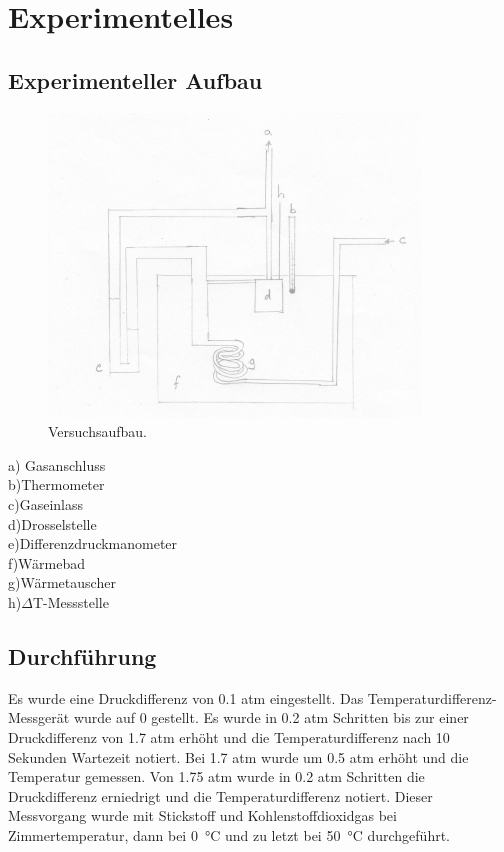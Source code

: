 \documentclass[a4paper,12pt,oneside,onecolum,final,openany]{report}
\begin{document}
\chapter{Experimentelles}
\section{Experimenteller Aufbau}
\begin{figure} [h!]
\begin{center}
\includegraphics[scale=1.5]{VersuchsaufbauJT.png} \end{center}
\caption{Versuchsaufbau.}
\end{figure}
a) Gasanschluss\\
b)Thermometer\\
c)Gaseinlass\\
d)Drosselstelle\\
e)Differenzdruckmanometer\\
f)Wärmebad\\
g)Wärmetauscher\\
h)$\Delta$T-Messstelle\\
\section{Durchführung}
Es wurde eine Druckdifferenz von 0.1 atm eingestellt. Das Temperaturdifferenz-Messgerät wurde auf 0 gestellt. Es wurde in 0.2 atm Schritten bis zur einer Druckdifferenz von 1.7 atm erhöht und die Temperaturdifferenz nach 10 Sekunden Wartezeit notiert. Bei 1.7 atm wurde um 0.5 atm erhöht und die Temperatur gemessen. Von 1.75 atm wurde in 0.2 atm Schritten die Druckdifferenz erniedrigt und die Temperaturdifferenz notiert. Dieser Messvorgang wurde mit Stickstoff und Kohlenstoffdioxidgas bei Zimmertemperatur, dann bei 0~°C und zu letzt bei 50~°C durchgeführt.
\end{document}

